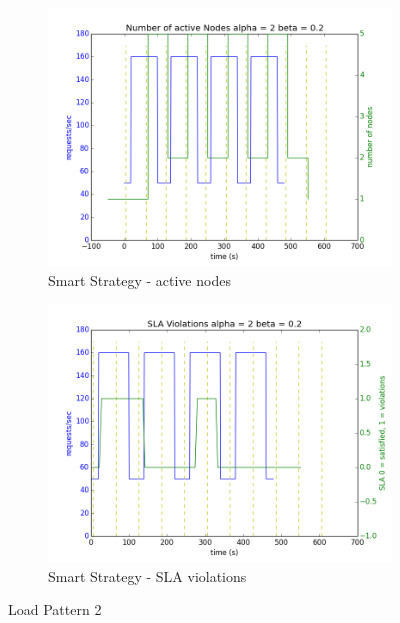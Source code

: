 \documentclass[12pt]{article}
\begin{document}
\begin{figure}[h!]
\begin{subfigure}{.5\textwidth}
\includegraphics[width=\textwidth]{Smart222nodes.png}
\caption{Smart Strategy - active nodes}
\end{subfigure}
\begin{subfigure}{.5\textwidth}
\includegraphics[width=\textwidth]{Smart282SLA.png}
\caption{Smart Strategy - SLA violations}
\end{subfigure}

\label{load2}
\caption{Load Pattern 2}
\end{figure}
\end{document}
